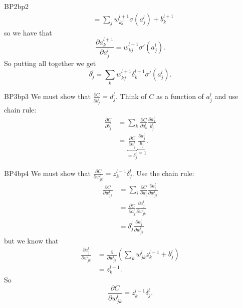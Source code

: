 \documentclass[a4paper,9pt]{extarticle}
\begin{document}
\begin{multicols*}{2}
\begin{myproof}{\color{LightSalmon2}BP2}{bp2}
\begin{align*}
				&=\sum_{j}w_{kj}^{l+1}\sigma(a^{l}_{j})+b^{l+1}_{k}
			\end{align*}
			so we have that
			\begin{equation*}
				\frac{\partial a^{l+1}_{k}}{\partial a_{j}^{l}}=w_{kj}^{l+1}\sigma'(a^{l}_{j}).
			\end{equation*}
			So putting all together we get
			\begin{equation*}
				\delta_{j}^{l}=\sum_{k}w_{kj}^{l+1}\delta_{k}^{l+1}\sigma'(a^{l}_{j}).
			\end{equation*}
		\end{myproof}
		\begin{myproof}{\color{LightSalmon2}BP3}{bp3}
			We must show that $\frac{\partial C}{\partial b^{l}_{j}}=d^{l}_{j}$. Think of $C$ as a function of $a^{l}_{j}$ and use chain rule:
			\begin{align*}
				\frac{\partial C}{\partial b_{j}^{l}}&=\sum_{k}\frac{\partial C}{\partial a^{l}_{k}}\frac{\partial a^{l}_{k}}{b_{j}^{l}}\\
				&=\underbracket{\frac{\partial C}{\partial a_{j}^{l}}}_{=\delta_{j}^{l}}\underbracket{\frac{\partial a_{j}^{l}}{b_{j}}}_{=1}.
			\end{align*}
		\end{myproof}
		\begin{myproof}{\color{LightSalmon2}BP4}{bp4}
			We must show that $\frac{\partial C}{\partial w_{jk}^{l}}=z_{k}^{l-1}\delta^{l}_{j}$. Use the chain rule:
			\begin{align*}
				\frac{\partial C}{\partial w_{jk}^{l}}&=\sum_{i}\frac{\partial C}{\partial a_{i}^{l}}\frac{\partial a_{i}^{l}}{\partial w_{jk}^{l}}\\
				&=\frac{\partial C}{\partial a_{j}^{l}}\frac{\partial a_{j}^{l}}{\partial w_{jk}^{l}}\\
				&=\delta_{j}^{l}\frac{\partial a_{j}^{l}}{\partial w_{jk}^{l}}
			\end{align*}
			but we know that 
			\begin{align*}
				\frac{\partial a_{j}^{l}}{\partial w_{jk}^{l}}&=\frac{\partial}{\partial w_{jk}^{l}}\left(\sum_{k}w^{l}_{jk}z^{l-1}_{k}+b_{j}^{l}\right)\\
				&=z_{k}^{l-1}.
			\end{align*}
			So
			\begin{equation*}
				\frac{\partial C}{\partial w_{jk}^{l}}=z_{k}^{l-1}\delta^{l}_{j}.
			\end{equation*}
		\end{myproof}

\end{multicols*}
\end{document}
